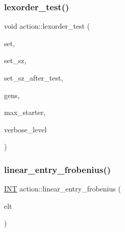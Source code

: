 \mbox{\label{classaction_a9ff38f81bf4d9e0d3dcb681eb8aa1998}} 
\subsubsection{\texorpdfstring{lexorder\+\_\+test()}{lexorder\_test()}}
{\footnotesize\ttfamily void action\+::lexorder\+\_\+test (\begin{DoxyParamCaption}\item[{\mbox{\hyperlink{galois_8h_a09fddde158a3a20bd2dcadb609de11dc}{I\+NT}} $\ast$}]{set,  }\item[{\mbox{\hyperlink{galois_8h_a09fddde158a3a20bd2dcadb609de11dc}{I\+NT}}}]{set\+\_\+sz,  }\item[{\mbox{\hyperlink{galois_8h_a09fddde158a3a20bd2dcadb609de11dc}{I\+NT}} \&}]{set\+\_\+sz\+\_\+after\+\_\+test,  }\item[{\mbox{\hyperlink{classvector__ge}{vector\+\_\+ge}} $\ast$}]{gens,  }\item[{\mbox{\hyperlink{galois_8h_a09fddde158a3a20bd2dcadb609de11dc}{I\+NT}}}]{max\+\_\+starter,  }\item[{\mbox{\hyperlink{galois_8h_a09fddde158a3a20bd2dcadb609de11dc}{I\+NT}}}]{verbose\+\_\+level }\end{DoxyParamCaption})}

\mbox{\label{classaction_a4c3cb883e5e0911fca60220fe51f04fa}} 
\subsubsection{\texorpdfstring{linear\+\_\+entry\+\_\+frobenius()}{linear\_entry\_frobenius()}}
{\footnotesize\ttfamily \mbox{\hyperlink{galois_8h_a09fddde158a3a20bd2dcadb609de11dc}{I\+NT}} action\+::linear\+\_\+entry\+\_\+frobenius (\begin{DoxyParamCaption}\item[{void $\ast$}]{elt }\end{DoxyParamCaption})}

\mbox{\label{classaction_af5e2f9aa7600ca2403f8962dbd1259d8}} 
